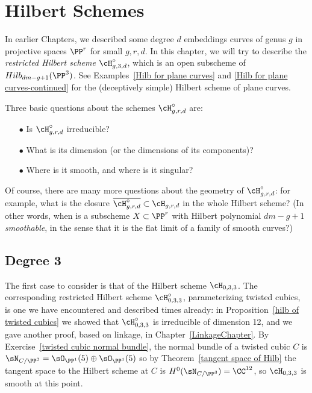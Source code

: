

\chapter{Hilbert Schemes}
\label{HilbertSchemesChapter}

In earlier Chapters, we described some  degree $d$ embeddings curves of  genus $g$ in projective spaces $\PP^r$ for small $g,r,d$. In this chapter, we will try to describe the \emph{restricted Hilbert scheme} $\cH^\circ_{g,3,d}$, 
which is an open subscheme of $Hilb_{dm-g+1}(\PP^3)$. See Examples~\ref{Hilb for plane curves} and \ref{Hilb for plane curves-continued} for the (deceptively simple) Hilbert scheme of plane curves. 

Three basic questions about the schemes $\cH^\circ_{g,r,d}$ are:

\begin{enumerate}
\item[$\bullet$] Is $\cH^\circ_{g,r,d}$ irreducible? 
\item[$\bullet$]  What is its dimension (or the dimensions of its components)?
\item[$\bullet$] Where is it smooth, and where is it singular?
\end{enumerate}

Of course, there are many more questions about the geometry of $\cH^\circ_{g,r,d}$: for example,  what is the closure $\overline{\cH^\circ_{g,r,d}} \subset \cH_{g,r,d}$ in the whole Hilbert scheme? (In other words, when is a subscheme $X \subset \PP^r$ with Hilbert polynomial $dm-g+1$ \emph{smoothable}, in the sense that it is the flat limit of a family of smooth curves?) 


\section{Degree 3}

The first case to consider is that of the Hilbert scheme  $\cH_{0,3,3}$. The corresponding restricted Hilbert scheme $\cH^\circ_{0,3,3}$, parameterizing twisted cubics, is one we have encountered and described times already: in Proposition~\ref{hilb of twisted cubics} we showed that $\cH^\circ_{0,3,3}$ is irreducible of dimension 12,
and we gave another proof, based on linkage, in Chapter~\ref{LinkageChapter}. 
By Exercise~\ref{twisted cubic normal bundle}, the normal bundle of a twisted cubic $C$ is $\sN_{C/\PP^3}=\sO_{\PP^1}(5)\oplus \sO_{\PP^1}(5)$
so by Theorem~\ref{tangent space of Hilb} the tangent space to the Hilbert scheme at $C$ is
$H^0(\sN_{C/\PP^3}) = \CC^{12}$, so $\cH_{0,3,3}$ is smooth at this point.

